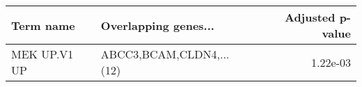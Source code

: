 \begin{tabular}{llr}
\toprule
   Term name &     Overlapping genes... &  Adjusted p-value \\
\midrule
MEK UP.V1 UP & ABCC3,BCAM,CLDN4,...(12) &          1.22e-03 \\
\bottomrule
\end{tabular}
